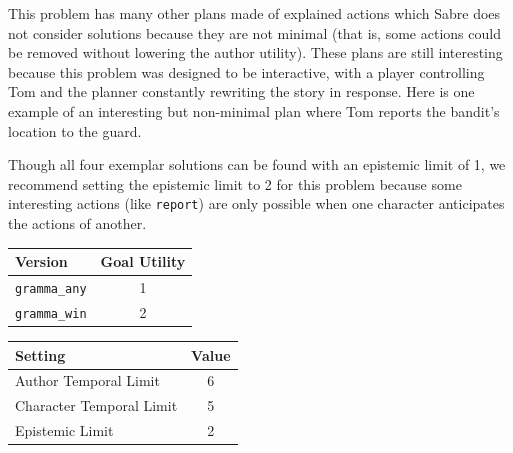 \documentclass{nilreport}
\begin{document}
\medskip{}

\noindent This problem has many other plans made of explained actions
which Sabre does not consider solutions because they are not minimal
(that is, some actions could be removed without lowering the author
utility). These plans are still interesting because this problem was
designed to be interactive, with a player controlling Tom and the
planner constantly rewriting the story in response. Here is one example
of an interesting but non-minimal plan where Tom reports the bandit's
location to the guard.

\medskip{}
\noindent{}

\medskip{}

\noindent Though all four exemplar solutions can be found with an
epistemic limit of 1, we recommend setting the epistemic limit to
2 for this problem because some interesting actions (like \texttt{report})
are only possible when one character anticipates the actions of another.

\medskip{}

\begin{center}
\begin{tabular}[t]{|l|c|}
\hline 
\textbf{Version} & \textbf{Goal Utility}\tabularnewline
\hline 
\hline 
\texttt{gramma\_any} & 1\tabularnewline
\hline 
\texttt{gramma\_win} & 2\tabularnewline
\hline 
\end{tabular}\textbf{\quad{}}%
\begin{tabular}[t]{|l|c|}
\hline 
\textbf{Setting} & \textbf{Value}\tabularnewline
\hline 
\hline 
Author Temporal Limit & 6\tabularnewline
\hline 
Character Temporal Limit & 5\tabularnewline
\hline 
Epistemic Limit & 2\tabularnewline
\hline 
\end{tabular}
\par\end{center}
\end{document}
